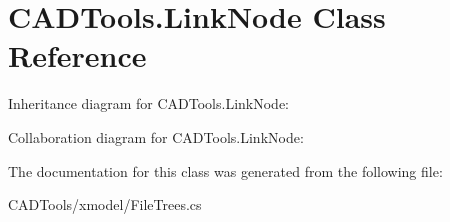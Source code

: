 \hypertarget{class_c_a_d_tools_1_1_link_node}{}\section{C\+A\+D\+Tools.\+Link\+Node Class Reference}
\label{class_c_a_d_tools_1_1_link_node}


Inheritance diagram for C\+A\+D\+Tools.\+Link\+Node\+:


Collaboration diagram for C\+A\+D\+Tools.\+Link\+Node\+:


The documentation for this class was generated from the following file\+:\begin{DoxyCompactItemize}
\item 
C\+A\+D\+Tools/xmodel/File\+Trees.\+cs\end{DoxyCompactItemize}
